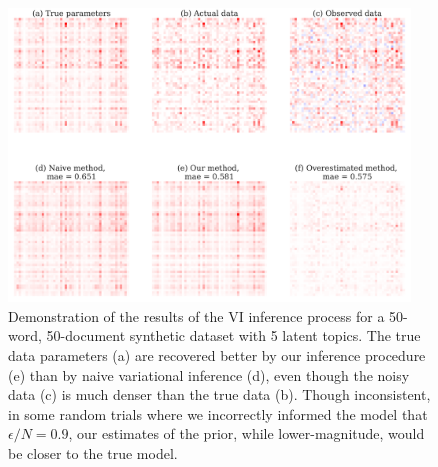 \documentclass[letterpaper]{article}
\newcommand{\Yten}{\pmb{Y}}
\begin{document}
  \begin{figure}[t]
    \centering
    \includegraphics[width=0.95\textwidth]{figures/test_output.pdf}
    \caption{Demonstration of the results of the VI inference process for a
     50-word, 50-document synthetic dataset with 5 latent topics. The true
     data parameters (a) are recovered better by our inference procedure (e)
     than by naive variational inference (d), even though the noisy data (c)
     is much denser than the true data (b). Though inconsistent, in some random
     trials where we incorrectly informed the model that $\epsilon / N = 0.9$,
     our estimates of the prior, while lower-magnitude, would be closer to the
     true model.}
    \label{fig:test_output}
\end{figure}
  
  
\end{document}
